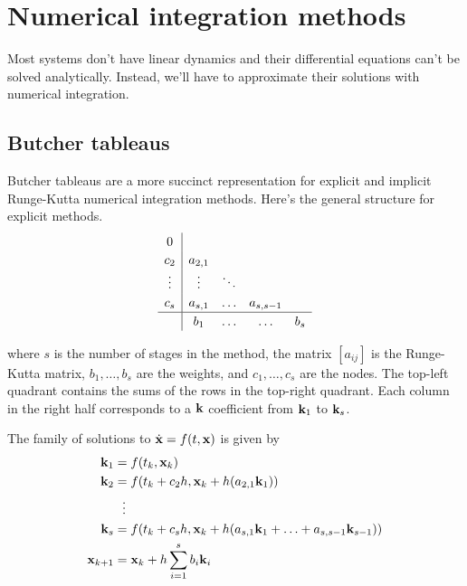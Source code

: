 \section{Numerical integration methods}
\label{sec:numerical_integration_methods}

Most systems don't have linear dynamics and their differential equations can't
be solved analytically. Instead, we'll have to approximate their solutions with
numerical integration.

\subsection{Butcher tableaus}

Butcher tableaus are a more succinct representation for explicit and implicit
Runge-Kutta numerical integration methods. Here's the general structure for
explicit methods.
\begin{equation*}
  \renewcommand\arraystretch{1.2}
  \begin{array}{c|cccc}
    0 \\
    c_2    & a_{2,1} \\
    \vdots & \vdots & \ddots \\
    c_s    & a_{s,1} & \hdots & a_{s,s-1} \\
    \hline
           & b_1    & \hdots & \hdots    & b_s
  \end{array}
\end{equation*}

where $s$ is the number of stages in the method, the matrix $[a_{ij}]$ is the
Runge-Kutta matrix, $b_1, \ldots, b_s$ are the weights, and $c_1, \ldots, c_s$
are the nodes. The top-left quadrant contains the sums of the rows in the
top-right quadrant. Each column in the right half corresponds to a $\mathbf{k}$
coefficient from $\mathbf{k}_1$ to $\mathbf{k}_s$.

The family of solutions to $\dot{\mathbf{x}} = f(t, \mathbf{x})$ is given by
\begin{align*}
  \mathbf{k}_1 &= f(t_k, \mathbf{x}_k) \\
  \mathbf{k}_2 &= f(t_k + c_2 h, \mathbf{x}_k + h (a_{2,1} \mathbf{k}_1)) \\
  &\ \ \vdots \\
  \mathbf{k}_s &= f(t_k + c_s h, \mathbf{x}_k +
    h (a_{s,1} \mathbf{k}_1 + \ldots + a_{s,s-1} \mathbf{k}_{s-1})) \\
  \mathbf{x}_{k+1} &= \mathbf{x}_k + h \sum_{i=1}^s b_i \mathbf{k}_i
\end{align*}

